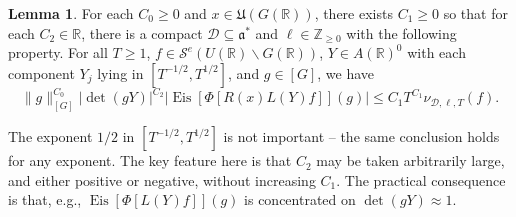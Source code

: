 \documentclass[reqno]{amsart}
\DeclareMathOperator{\Eis}{Eis}
\theoremstyle{plain} \newtheorem{theorem} {Theorem}
\theoremstyle{definition} \newtheorem{definition} [theorem] {Definition}
\theoremstyle{itplain} %
\newtheorem{lemma}[theorem]{Lemma}
\numberwithin{equation}{section}
\numberwithin{theorem}{section}
\renewcommand{\geq}{\geqslant}
\renewcommand{\leq}{\leqslant}
\begin{document}
\begin{lemma}\label{lem:standard2:crude-growth-bounds-completed-eisenstein-series}
  For each $C_0 \geq 0$ and $x \in \mathfrak{U}(G(\mathbb{R}))$, there exists $C_1 \geq 0$ so that for each $C_2 \in \mathbb{R}$, there is a compact $\mathcal{D} \subseteq \mathfrak{a}^*$  and $\ell \in \mathbb{Z}_{\geq 0}$ with the following property.  For all $T \geq 1$, $f \in \mathcal{S}^e(U(\mathbb{R}) \backslash G(\mathbb{R}))$, $Y \in A(\mathbb{R})^0$ with each component $Y_j$ lying in $[T^{-1/2}, T^{1/2}]$, and $g \in [G]$, we have
  \begin{equation*}
  \|g\|_{[G]}^{C_0} 
  \left\lvert     \det(g Y) \right\rvert^{C_2}
  \left\lvert \Eis[\Phi[ R(x) L(Y) f]](g) \right\rvert
  \leq C_1 T^{C_1} \nu_{\mathcal{D},\ell,T}(f).
\end{equation*}
\end{lemma}
\begin{remark}
  The exponent $1/2$ in $[T^{-1/2}, T^{1/2}]$ is not important -- the same conclusion holds for any exponent.  The key feature here is that $C_2$ may be taken arbitrarily large, and either positive or negative, without increasing $C_1$.  The practical consequence is that, e.g., $\Eis[\Phi[L(Y) f]](g)$ is concentrated on $\det(g Y) \approx 1$.
\end{remark}
\end{document}
